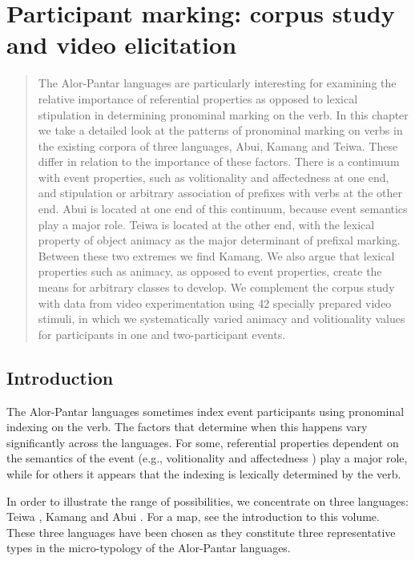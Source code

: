 
\chapter{Participant marking: corpus study and video elicitation}  

 

\begin{abstract}
 

The Alor-Pantar languages are particularly interesting for examining the relative importance of referential properties as opposed to lexical stipulation in determining pronominal marking on the verb. In this chapter we take a detailed look at the patterns of pronominal marking on verbs in the existing corpora of three languages, Abui, Kamang and Teiwa. These differ in relation to the importance of these factors. There is a continuum with event properties, such as volitionality and affectedness at one end, and stipulation or arbitrary association of prefixes with verbs at the other end. Abui is located at one end of this continuum, because event semantics play a major role. Teiwa is located at the other end, with the lexical property of object animacy as the major determinant of prefixal marking. Between these two extremes we find Kamang. We also argue that lexical properties such as animacy, as opposed to event properties, create the means for arbitrary classes to develop. We complement the corpus study with data from video experimentation using 42 specially prepared video stimuli, in which we systematically varied animacy and volitionality values for participants in one and two-participant events. 
\end{abstract}  
 
\section{Introduction}
\label{sec:10:1}
\hypertarget{Toc385255248}{}The Alor-Pantar languages sometimes index event participants using pronominal indexing  on the verb. The factors that determine when this happens vary significantly across the languages. For some, referential properties  dependent on the semantics of the event (e.g., volitionality  and affectedness ) play a major role, while for others it appears that the indexing is lexically determined by the verb.

In order to illustrate the range of possibilities, we concentrate on three languages: Teiwa , Kamang  and Abui . For a map, see the introduction to this volume. These three languages have been chosen as they constitute three representative types in the micro-typology of the Alor-Pantar languages. 

